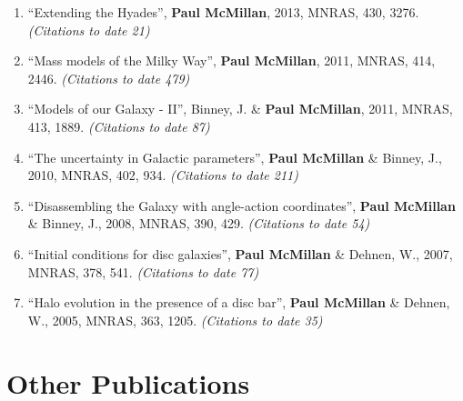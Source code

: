 \documentclass{resume}
\begin{document}
\begin{enumerate}
\item ``Extending the Hyades'', \textbf{Paul McMillan}, 2013, MNRAS, 430, 3276. \textit{(Citations to date 21)}

\item ``Mass models of the Milky Way'', \textbf{Paul McMillan}, 2011, MNRAS, 414, 2446. \textit{(Citations to date 479)}

\item ``Models of our Galaxy - II'', Binney, J. \& \textbf{Paul McMillan}, 2011, MNRAS, 413, 1889. \textit{(Citations to date 87)}

\item ``The uncertainty in Galactic parameters'', \textbf{Paul McMillan} \& Binney, J., 2010, MNRAS, 402, 934. \textit{(Citations to date 211)}

\item ``Disassembling the Galaxy with angle-action coordinates'', \textbf{Paul McMillan} \& Binney, J., 2008, MNRAS, 390, 429. \textit{(Citations to date 54)}

\item ``Initial conditions for disc galaxies'', \textbf{Paul McMillan} \& Dehnen, W., 2007, MNRAS, 378, 541. \textit{(Citations to date 77)}

\item ``Halo evolution in the presence of a disc bar'', \textbf{Paul McMillan} \& Dehnen, W., 2005, MNRAS, 363, 1205. \textit{(Citations to date 35)}

\end{enumerate}\section*{Other Publications}
\end{document}
